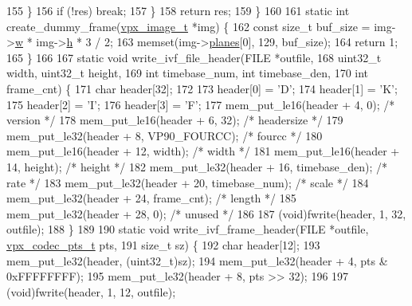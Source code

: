 \begin{DoxyCodeInclude}
{{{155     \}
156     \textcolor{keywordflow}{if} (!res) \textcolor{keywordflow}{break};
157   \}
158   \textcolor{keywordflow}{return} res;
159 \}
160 
161 \textcolor{keyword}{static} \textcolor{keywordtype}{int} create\_dummy\_frame(\hyperlink{structvpx__image}{vpx\_image\_t} *img) \{
162   \textcolor{keyword}{const} \textcolor{keywordtype}{size\_t} buf\_size = img->\hyperlink{structvpx__image_ac7b7d569142f878155b28141653adcd6}{w} * img->\hyperlink{structvpx__image_a9d1070804dfe08cd5becd68d597fee69}{h} * 3 / 2;
163   memset(img->\hyperlink{structvpx__image_ab6258308ba7a5f4a113348120e20e2ce}{planes}[0], 129, buf\_size);
164   \textcolor{keywordflow}{return} 1;
165 \}
166 
167 \textcolor{keyword}{static} \textcolor{keywordtype}{void} write\_ivf\_file\_header(FILE *outfile,
168                                   uint32\_t width, uint32\_t height,
169                                   \textcolor{keywordtype}{int} timebase\_num, \textcolor{keywordtype}{int} timebase\_den,
170                                   \textcolor{keywordtype}{int} frame\_cnt) \{
171   \textcolor{keywordtype}{char} header[32];
172 
173   header[0] = \textcolor{charliteral}{'D'};
174   header[1] = \textcolor{charliteral}{'K'};
175   header[2] = \textcolor{charliteral}{'I'};
176   header[3] = \textcolor{charliteral}{'F'};
177   mem\_put\_le16(header + 4, 0);             \textcolor{comment}{/* version */}
178   mem\_put\_le16(header + 6, 32);            \textcolor{comment}{/* headersize */}
179   mem\_put\_le32(header + 8, VP90\_FOURCC);   \textcolor{comment}{/* fourcc */}
180   mem\_put\_le16(header + 12, width);        \textcolor{comment}{/* width */}
181   mem\_put\_le16(header + 14, height);       \textcolor{comment}{/* height */}
182   mem\_put\_le32(header + 16, timebase\_den); \textcolor{comment}{/* rate */}
183   mem\_put\_le32(header + 20, timebase\_num); \textcolor{comment}{/* scale */}
184   mem\_put\_le32(header + 24, frame\_cnt);    \textcolor{comment}{/* length */}
185   mem\_put\_le32(header + 28, 0);            \textcolor{comment}{/* unused */}
186 
187   (void)fwrite(header, 1, 32, outfile);
188 \}
189 
190 \textcolor{keyword}{static} \textcolor{keywordtype}{void} write\_ivf\_frame\_header(FILE *outfile, \hyperlink{group__encoder_ga7e711b0a71c65aef8f0faea8bd57b05f}{vpx\_codec\_pts\_t} pts,
191                                    \textcolor{keywordtype}{size\_t} sz) \{
192   \textcolor{keywordtype}{char} header[12];
193   mem\_put\_le32(header, (uint32\_t)sz);
194   mem\_put\_le32(header + 4, pts & 0xFFFFFFFF);
195   mem\_put\_le32(header + 8, pts >> 32);
196 
197   (void)fwrite(header, 1, 12, outfile);
}}}
\end{DoxyCodeInclude}
